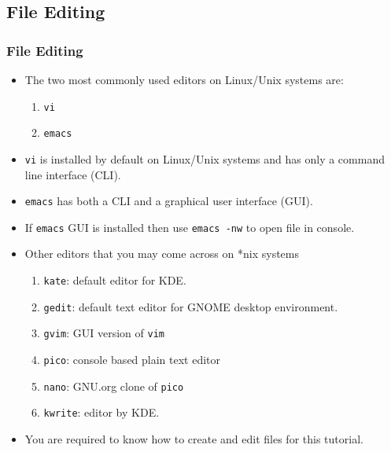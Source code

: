\documentclass[slidestop,mathserif,compress,xcolor=svgnames]{beamer}
\newcommand*\vardiamond{\textcolor{tigerspurple}{%
  \ensuremath{\blacklozenge}}}
\begin{document}
\subsection{File Editing}
\begin{frame}
  \frametitle{\small File Editing}
  \begin{itemize}
    \item The two most commonly used editors on Linux/Unix systems are:
    \begin{enumerate}
      \item \texttt{vi}
      \item \texttt{emacs}
    \end{enumerate}
    \item \texttt{vi} is installed by default on Linux/Unix systems and has only a command line interface (CLI).
    \item \texttt{emacs} has both a CLI and a graphical user interface (GUI).
    \item[$\vardiamond$] If \texttt{emacs} GUI is installed then use \texttt{emacs -nw} to open file in console.
    \item Other editors that you may come across on *nix systems
    \begin{enumerate}
      \item \texttt{kate}: {\scriptsize default editor for KDE.}
      \item \texttt{gedit}: {\scriptsize default text editor for GNOME desktop environment.}
      \item \texttt{gvim}: {\scriptsize GUI version of }\texttt{vim}
      \item \texttt{pico}: {\scriptsize console based plain text editor }
      \item \texttt{nano}: {\scriptsize GNU.org clone of }\texttt{pico}
      \item \texttt{kwrite}: {\scriptsize editor by KDE.}
    \end{enumerate}
    \item {\color{red}You are required to know how to create and edit files for this tutorial.}
  \end{itemize}
\end{frame}
\end{document}
